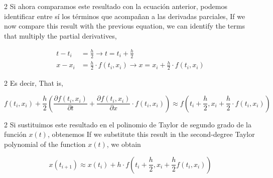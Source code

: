 \begin{paracol}{2}
Si ahora comparamos este resultado con la ecuación anterior, podemos identificar entre sí los términos que acompañan a las derivadas parciales,
\switchcolumn
If we now compare this result with the previous equation, we can identify the terms that multiply the partial derivatives,
\end{paracol}
\begin{align*}
t-t_i&=\frac{h}{2} \rightarrow t=t_i+\frac{h}{2}\\
x-x_i&=\frac{h}{2}\cdot f(t_i,x_i) \rightarrow x=x_i+\frac{h}{2}\cdot f(t_i,x_i)
\end{align*}
\begin{paracol}{2}
Es decir,
\switchcolumn
That is,
\end{paracol}
\begin{equation*}
f(t_i,x_i)+\frac{h}{2}\left(\frac{\partial f(t_i,x_i)}{\partial t}+\frac{\partial f(t_i,x_i)}{\partial x}\cdot f(t_i,x_i)\right)\approx f\left(t_i+\frac{h}{2},x_i+\frac{h}{2}\cdot f(t_i,x_i)\right)
\end{equation*}
\begin{paracol}{2}
Si sustituimos este resultado en el polinomio de Taylor de segundo grado de la función $x(t)$, obtenemos
\switchcolumn
If we substitute this result in the second-degree Taylor polynomial of the function $x(t)$, we obtain
\end{paracol}
\begin{equation*}
x(t_{i+1})\approx x(t_i)+h\cdot f\left(t_i+\frac{h}{2},x_i+\frac{h}{2}f(t_i,x_i)\right)
\end{equation*}


